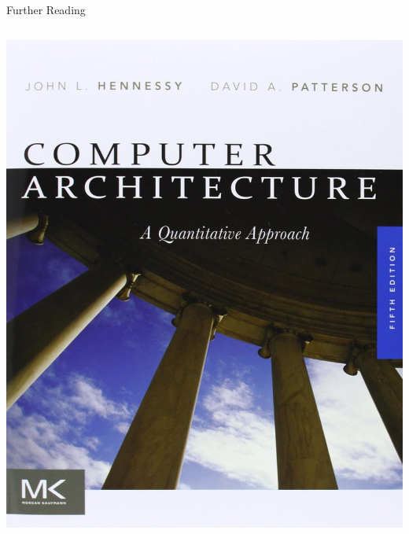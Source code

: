 \documentclass[12pt, aspectration=169]{beamer}
\begin{document}
\begin{frame}{Further Reading}
\begin{center}
\begin{columns}
                \includegraphics[scale=0.075]{static/images/computer_architecture}
            \end{columns}
        \end{center}
    \end{frame}
\end{document}
